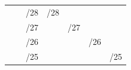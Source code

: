 \documentclass[11pt,a4paper]{report}
\begin{document}
\begin{table}[]
\begin{center}
\begin{tabular}{rlcccccccccccccccc}
                                                                                                         & \multicolumn{1}{l|}{} & \multicolumn{8}{l}{\cellcolor[HTML]{BFBFBF}/28}                                                                                                                                                                                  & \multicolumn{2}{c}{\multirow{-3}{*}{\cellcolor[HTML]{BFBFBF}/28}} & \multicolumn{2}{c}{\cellcolor[HTML]{FFD966}}                      & \multicolumn{2}{c}{\cellcolor[HTML]{A9D08E}}                      & \multicolumn{2}{c|}{\cellcolor[HTML]{F4B084}}                      \\
                                                                                                         & \multicolumn{1}{l|}{} & \multicolumn{10}{l}{\cellcolor[HTML]{FFD966}/27}                                                                                                                                                                                                                                                     & \multicolumn{2}{c}{\multirow{-4}{*}{\cellcolor[HTML]{FFD966}/27}} & \multicolumn{2}{c}{\cellcolor[HTML]{A9D08E}}                      & \multicolumn{2}{c|}{\cellcolor[HTML]{F4B084}}                      \\
                                                                                                         & \multicolumn{1}{l|}{} & \multicolumn{12}{l}{\cellcolor[HTML]{A9D08E}/26}                                                                                                                                                                                                                                                                                                                         & \multicolumn{2}{c}{\multirow{-5}{*}{\cellcolor[HTML]{A9D08E}/26}} & \multicolumn{2}{c|}{\cellcolor[HTML]{F4B084}}                      \\
                                                                                                         & \multicolumn{1}{l|}{} & \multicolumn{14}{l}{\cellcolor[HTML]{F4B084}/25}                                                                                                                                                                                                                                                                                                                                                                                             & \multicolumn{2}{c|}{\multirow{-6}{*}{\cellcolor[HTML]{F4B084}/25}} \\

\end{tabular}
\end{center}
\end{table}
\end{document}
